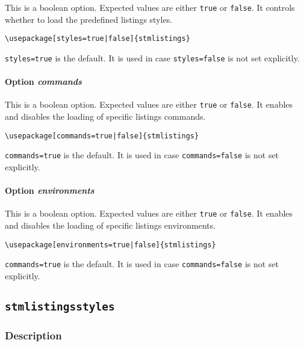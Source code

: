 \documentclass[%
  type=article,%
  layout=koma,%
  hyperref=true,%
  date=true,%
  listings=false,%
  tabular=true,%
]{stmtext}
\begin{document}
This is a boolean option. Expected values are either \texttt{true} or \texttt{false}. It controls whether to load the predefined listings styles.

\begin{verbatim}
\usepackage[styles=true|false]{stmlistings}
\end{verbatim}

\texttt{styles=true} is the default. It is used in case \texttt{styles=false} is not set explicitly.

\paragraph{Option \protect\textit{commands}} 
\label{sec:usage:preamble:wholepackage:options:commands}

This is a boolean option. Expected values are either \texttt{true} or \texttt{false}. It enables and disables the loading of specific listings commands.

\begin{verbatim}
\usepackage[commands=true|false]{stmlistings}
\end{verbatim}

\texttt{commands=true} is the default. It is used in case \texttt{commands=false} is not set explicitly.

\paragraph{Option \protect\textit{environments}} 
\label{sec:usage:preamble:wholepackage:options:environments}

This is a boolean option. Expected values are either \texttt{true} or \texttt{false}. It enables and disables the loading of specific listings environments.

\begin{verbatim}
\usepackage[environments=true|false]{stmlistings}
\end{verbatim}

\texttt{commands=true} is the default. It is used in case \texttt{commands=false} is not set explicitly.

\subsection{\protect\texttt{stmlistingsstyles}}
\label{sec:usage:preamble:styles}

\subsubsection{Description}
\label{sec:usage:preamble:styles:description}
\end{document}
